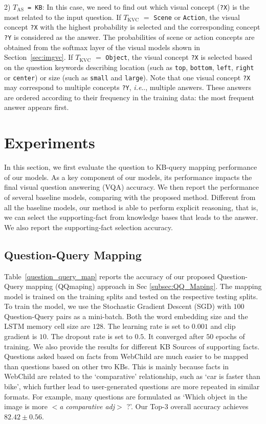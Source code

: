 \documentclass[10pt,journal]{IEEEtran}
\makeatletter
\DeclareRobustCommand\onedot{\futurelet\@let@token\@onedot}
\def\@onedot{\ifx\@let@token.\else.\null\fi\xspace}
\def\ie{\emph{i.e}\onedot} \def\Ie{\emph{I.e}\onedot}
\def\bluett{}
\makeatother
\begin{document}
\bluett{
2) {\texttt{$T_{\mbox{AS}}$ = KB}}:
In this case, 
we need to find out which visual concept (\texttt{?X}) is the most related to the input question.
If \texttt{$T_{\mbox{KVC}}$} $=$ \texttt{Scene} or \texttt{Action},
the visual concept \texttt{?X} with the highest probability 
is selected and the corresponding concept \texttt{?Y} is considered as the answer.
The probabilities of scene or action concepts are obtained 
from the softmax layer of the visual models shown in Section~\ref{sec:imgvc}.
If \texttt{$T_{\mbox{KVC}}$} $=$ \texttt{Object},
the visual concept \texttt{?X} is selected based on the question keywords describing location
(such as \texttt{top}, \texttt{bottom}, \texttt{left}, \texttt{right} or \texttt{center})
or size (such as \texttt{small} and \texttt{large}).
{ Note that one visual concept \texttt{?X} may correspond to multiple concepts \texttt{?Y}, 
\ie, multiple answers.
These answers are ordered according to their frequency in the training data:
the most frequent answer appears first.}
}



\section{Experiments}
\label{expe}
In this section, we first evaluate the question to KB-query mapping performance of our models. As a key component of our models, its performance impacts the final visual question answering (VQA) accuracy. We then report the performance of several baseline models, comparing with the proposed method. Different from all the baseline models, our method is able to perform explicit reasoning, that is, we can select the supporting-fact from knowledge bases that leads to the answer. We also report the supporting-fact selection accuracy.


\subsection{Question-Query Mapping}
Table~\ref{question_query_map} reports the accuracy of our proposed Question-Query mapping (QQmaping) approach in Sec \ref{subsec:QQ_Maping}. The mapping model is trained on the \KBName training splits and tested on the respective testing splits. To train the model, we use the Stochastic Gradient Descent (SGD) with $100$ Question-Query pairs as a mini-batch. Both the word embedding size and the LSTM memory cell size are $128$. The learning rate is set to $0.001$ and clip gradient is $10$. The dropout rate is set to $0.5$. It converged after $50$ epochs of training. We also provide the results for different KB Sources of supporting facts. Questions asked based on facts from WebChild are much easier to be mapped than questions based on other two KBs. This is mainly because facts in WebChild are related to the `comparative' relationship, such as `car is faster than bike', which further lead to user-generated questions are more repeated in similar formats. For example, many questions are formulated as `Which object in the image is more $<$\textit{a comparative adj}$>$ ?'. Our Top-3 overall accuracy achieves $82.42\pm0.56$.
\end{document}
